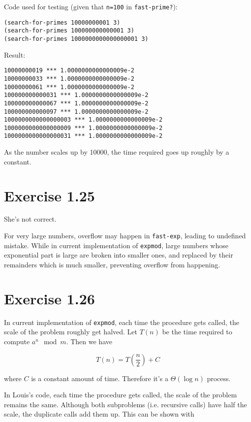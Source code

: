 \documentclass[../main.tex]{subfiles}
\begin{document}
Code used for testing (given that \lstinline{n=100} in \lstinline{fast-prime?}):

\begin{lstlisting}
(search-for-primes 10000000001 3)
(search-for-primes 100000000000001 3)
(search-for-primes 1000000000000000001 3)
\end{lstlisting}

Result:

\begin{lstlisting}
10000000019 *** 1.0000000000000009e-2
10000000033 *** 1.0000000000000009e-2
10000000061 *** 1.0000000000000009e-2
100000000000031 *** 1.0000000000000009e-2
100000000000067 *** 1.0000000000000009e-2
100000000000097 *** 1.0000000000000009e-2
1000000000000000003 *** 1.0000000000000009e-2
1000000000000000009 *** 1.0000000000000009e-2
1000000000000000031 *** 1.0000000000000009e-2
\end{lstlisting}

As the number scales up by 10000, the time required
 goes up roughly by a constant.

\section{Exercise 1.25}

She's not correct.

For very large numbers, overflow may happen in \lstinline{fast-exp}, leading to undefined mistake.
 While in current implementation of \lstinline{expmod}, large numbers whose exponential part is
 large are broken into smaller ones, and replaced by their remainders which is much smaller, preventing
 overflow from happening.

\section{Exercise 1.26}

In current implementation of \lstinline{expmod}, each time the procedure gets called, the scale of the
 problem roughly get halved. Let $T(n)$ be the time required to compute $a^n \mod m$. Then we have

$$
T(n) = T\left(\frac{n}{2}\right) + C
$$

where $C$ is a constant amount of time. Therefore it's a $\Theta(\log n)$ process.

In Louis's code, each time the procedure gets called, the scale of the problem remains the same. Although
 both subproblems (i.e. recursive calls) have half the scale, the duplicate calls add them up.
 This can be shown with
\end{document}
